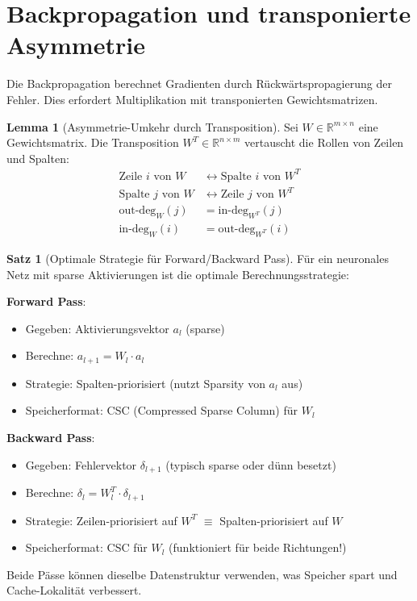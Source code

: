 ﻿\documentclass[a4paper,12pt]{report}
\theoremstyle{definition}
\newtheorem{satz}{Satz}
\newtheorem{lemma}{Lemma}
\begin{document}
	\section{Backpropagation und transponierte Asymmetrie}
	
	Die Backpropagation berechnet Gradienten durch Rückwärtspropagierung der Fehler. Dies erfordert Multiplikation mit transponierten Gewichtsmatrizen.
	
	\begin{lemma}[Asymmetrie-Umkehr durch Transposition]
		Sei $W \in \mathbb{R}^{m \times n}$ eine Gewichtsmatrix. Die Transposition $W^T \in \mathbb{R}^{n \times m}$ vertauscht die Rollen von Zeilen und Spalten:
		\begin{align}
			\text{Zeile } i \text{ von } W &\leftrightarrow \text{Spalte } i \text{ von } W^T \\
			\text{Spalte } j \text{ von } W &\leftrightarrow \text{Zeile } j \text{ von } W^T \\
			\text{out-deg}_W(j) &= \text{in-deg}_{W^T}(j) \\
			\text{in-deg}_W(i) &= \text{out-deg}_{W^T}(i)
		\end{align}
	\end{lemma}
	
	\begin{satz}[Optimale Strategie für Forward/Backward Pass]
		Für ein neuronales Netz mit sparse Aktivierungen ist die optimale Berechnungsstrategie:
		
		\textbf{Forward Pass}: 
		\begin{itemize}
			\item Gegeben: Aktivierungsvektor $a_l$ (sparse)
			\item Berechne: $a_{l+1} = W_l \cdot a_l$
			\item Strategie: Spalten-priorisiert (nutzt Sparsity von $a_l$ aus)
			\item Speicherformat: CSC (Compressed Sparse Column) für $W_l$
		\end{itemize}
		
		\textbf{Backward Pass}:
		\begin{itemize}
			\item Gegeben: Fehlervektor $\delta_{l+1}$ (typisch sparse oder dünn besetzt)
			\item Berechne: $\delta_l = W_l^T \cdot \delta_{l+1}$
			\item Strategie: Zeilen-priorisiert auf $W^T$ $\equiv$ Spalten-priorisiert auf $W$
			\item Speicherformat: CSC für $W_l$ (funktioniert für beide Richtungen!)
		\end{itemize}
		
		Beide Pässe können dieselbe Datenstruktur verwenden, was Speicher spart und Cache-Lokalität verbessert.
	\end{satz}
	
\end{document}
